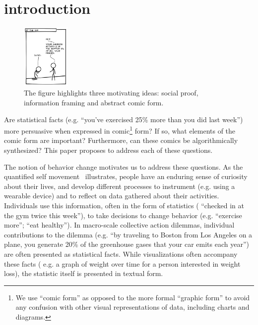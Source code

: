 



\section{introduction}
\label{sec:introduction}

\begin{figure}
    \centering
    \includegraphics[width=0.21\textwidth]{figures/intro_new.png}
  \vspace{-10pt}
  \caption{The figure highlights three motivating ideas: social proof, information framing and abstract comic form.} \label{fig:intro}
  \vspace{-10pt}
\end{figure}

Are statistical facts (e.g. ``you've exercised 25\% more than you did last week'') more persuasive when expressed in comic\footnote{We use ``comic form'' as opposed to the more formal ``graphic form'' to avoid any confusion with other visual representations of data, including charts and diagrams.} form? If so, what elements of the comic form are important? Furthermore, can these comics be algorithmically synthesized? This paper proposes to address each of these questions.

The notion of behavior change motivates us to address these questions. As the quantified self movement~\cite{Epstein2014,Choe2014} illustrates, people have an enduring sense of curiosity about their lives, and develop different processes to instrument (e.g. using a wearable device) and to reflect on data gathered about their activities. Individuals use this information, often in the form of statistics ( ``checked in at the gym twice this week''), to take decisions to change behavior (e.g. ``exercise more''; ``eat healthy''). In macro-scale collective action dilemmas, individual contributions to the dilemma (e.g. ``by traveling to Boston from Los Angeles on a plane, you generate 20\% of the greenhouse gases that your car emits each year'') are often presented as statistical facts. While visualizations often accompany these facts ( e.g. a graph of weight over time for a person interested in weight loss), the statistic itself is presented in textual form.

